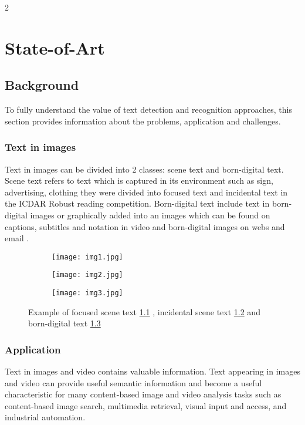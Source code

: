 
2\graphicspath{ {2chapterStateOfArt/image/} }
\chapter{State-of-Art} \label{State-of-Art}
\section{Background}

To fully understand the value of text detection and recognition approaches, this section provides information about the problems, application and challenges.
\subsection{Text in images}
Text in images can be divided into 2 classes: scene text and  born-digital text. Scene text refers to text which is captured in its environment such as sign, advertising, clothing they were divided into focused text and incidental text in the ICDAR Robust reading competition. Born-digital text include text in born-digital images or graphically added into an images which can be found on captions, subtitles and notation in video and born-digital images on webs and email \cite{Karatzas.2011.ICDAR}.


\begin{figure}

	\begin{subfigure}[b]{0.3\textwidth}
	 	\texttt{[image: img1.jpg]} \caption{}\label{fig:focused} \end{subfigure}
	\begin{subfigure}[b]{0.3\textwidth}
		\texttt{[image: img2.jpg]} \caption{}\label{fig:incidental} \end{subfigure}
	\begin{subfigure}[b]{0.3\textwidth}
		\texttt{[image: img3.jpg]} \caption{}\label{fig:bornDigital} \end{subfigure}
	\centering
	\caption[Example of \textit{text}] {Example of focused scene text \ref{fig:focused} , incidental scene text \ref{fig:incidental} and born-digital text \ref{fig:bornDigital} }
	\label{fig:example}
\end{figure}

\subsection{Application}
\par
Text in images and video contains valuable information. Text appearing in images and video can provide useful semantic information and become a useful characteristic for many content-based image and video analysis tasks such as content-based image search, multimedia retrieval, visual input and access, and industrial automation.

